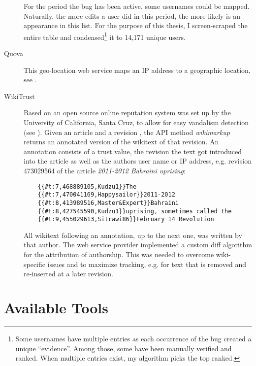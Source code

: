 \begin{description}
For the period the bug has been active, some usernames could be mapped.
Naturally, the more edits a user did in this period, the more likely is an appearance in this list.
For the purpose of this thesis, I screen-scraped the entire table and condensed\footnote{Some usernames have multiple entries as each occurrence of the bug created a unique ``evidence''. Among those, some have been manually verified and ranked. When multiple entries exist, my algorithm picks the top ranked.} it to 14,171 unique users.
\item[Quova] This geo-location web service maps an \ac{IP} address to a geographic location, see .
\item[WikiTrust] Based on \textcite{adler2008assigning} an open source online reputation system was set up by the University of California, Santa Cruz, to allow for easy vandalism detection (see ).
Given an article  and a revision , the \ac{API} method \emph{wikimarkup} returns an annotated version of the wikitext of that revision.
An annotation consists of a trust value, the revision  the text got introduced into the article as well as the authors user name or \ac{IP} address, e.g. revision 473029564 of the article \emph{2011-2012 Bahraini uprising}:
\begin{lstlisting}
	{{#t:7,468889105,Kudzu1}}The 
	{{#t:7,470041169,Happysailor}}2011-2012 
	{{#t:8,413989516,Master&Expert}}Bahraini 
	{{#t:8,427545590,Kudzu1}}uprising, sometimes called the
	{{#t:9,455029613,Sitrawi86}}February 14 Revolution 
\end{lstlisting}
All wikitext following an annotation, up to the next one, was written by that author.
The web service provider implemented a custom diff algorithm for the attribution of authorship.
This was needed to overcome wiki-specific issues and to maximize tracking, e.g. for text that is removed and re-inserted at a later revision.
\end{description}


\section{Available Tools}

